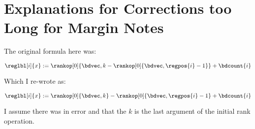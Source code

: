  \section{Explanations for Corrections too Long for Margin Notes}

\begin{correction}\label{cor:j_index}
The original formula here was:

$\reglbl[i]{x} := \rankop[0]{\bdvec,k - \rankop[0]{\bdvec,\regpos{i}-1}} + \bdcount{i}$

Which I re-wrote as:

$\reglbl[i]{x} := \rankop[0]{\bdvec,k} - \rankop[0]{\bdvec,\regpos{i}-1} + \bdcount{i}$

I assume there was in error and that the $k$ is the last argument of the initial
rank operation.
\end{correction}




